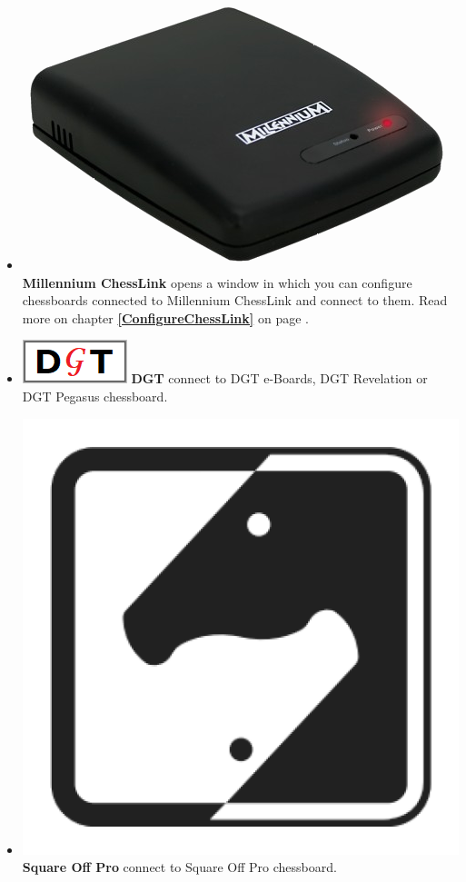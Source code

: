 \documentclass[11pt,a4paper]{article}
\begin{document}
\begin{itemize}
		\item  \includegraphics[scale=0.05]{Millennium ChessLink.png} \textbf{Millennium ChessLink} opens a window in which you can configure chessboards connected to Millennium ChessLink and connect to them.  Read more on chapter \textbf{\ref{ConfigureChessLink}  } on page \pageref{ConfigureChessLink}.
		\item  \includegraphics[scale=0.3]{dgt48.png} \textbf{DGT} connect to DGT e-Boards, DGT Revelation or DGT Pegasus chessboard.	
		\item  \includegraphics[scale=0.05]{squareoff.png} \textbf{Square Off Pro} connect to Square Off Pro chessboard.		

\end{itemize}
\end{document}
